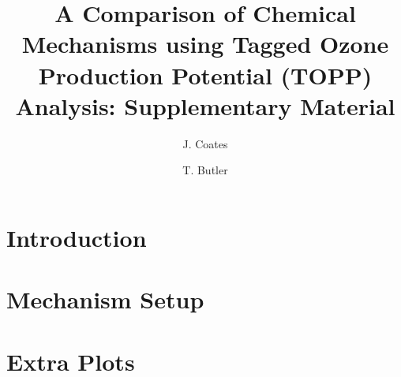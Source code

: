 \documentclass[11pt,a4paper]{article}
\title{A Comparison of Chemical Mechanisms using Tagged Ozone Production Potential (TOPP) Analysis: Supplementary Material}
\author[1]{J. Coates}%
\author[1]{T. Butler}
\affil[1]{Institute for Advanced Sustainability Studies, Potsdam, Germany}
\begin{document}
\maketitle

\section{Introduction} \label{s:introduction}


\section{Mechanism Setup} \label{s:mechanism}



\section{Extra Plots} \label{s:extra_plots}



 
\end{document}
